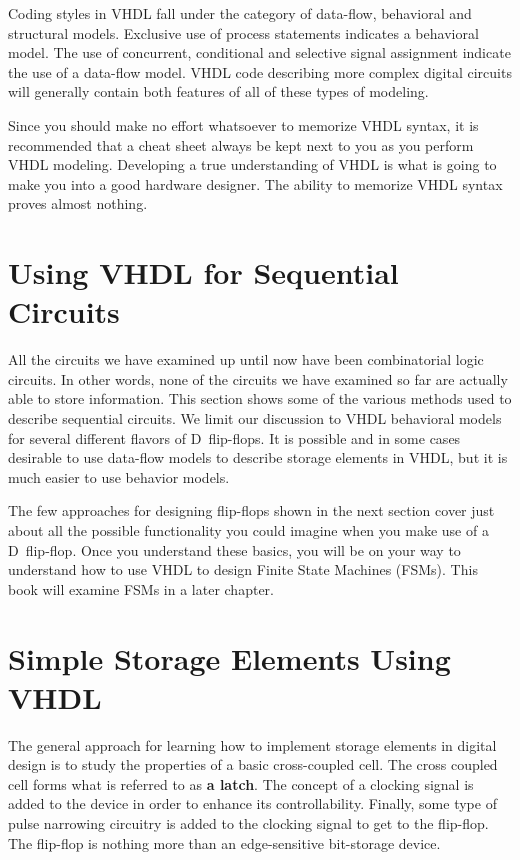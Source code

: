 Coding styles in VHDL fall under the category of data-flow, behavioral and structural models. Exclusive use of process statements indicates a   behavioral model. The use of concurrent, conditional and selective signal assignment indicate the use of a data-flow model. VHDL code describing more complex digital circuits will generally contain both features of all of these types of modeling. 

Since you should make no effort whatsoever to memorize VHDL syntax, it is recommended that a cheat sheet always be kept next to you as you perform VHDL modeling. Developing a true understanding of VHDL is what is going to make you into a good hardware designer. The ability to memorize VHDL syntax proves almost nothing. 

\section{Using VHDL for Sequential Circuits}
All the circuits we have examined up until now have been combinatorial logic circuits. In other words, none of the circuits we have examined so far are actually able to store information. This section shows some of the various methods used to describe sequential circuits. We limit our discussion to VHDL behavioral models for several different flavors of D~flip-flops. It is possible and in some cases desirable to use data-flow models to describe storage elements in VHDL, but it is much easier to use behavior models.   

The few approaches for designing flip-flops shown in the next section cover just about all the possible functionality you could imagine when you make use of a D~flip-flop. Once you understand these basics, you will be on your way to understand how to use VHDL to design Finite State Machines (FSMs). This book will examine FSMs in a later chapter.

\section{Simple Storage Elements Using VHDL}
The general approach for learning how to implement storage elements in digital design is to study the properties of a basic cross-coupled cell. The cross coupled cell forms what is referred to as \textbf{a latch}. The concept of a clocking signal is added to the device in order to enhance its controllability. Finally, some type of pulse narrowing circuitry is added to the clocking signal to get to the flip-flop. The flip-flop is nothing more than an edge-sensitive bit-storage device.

